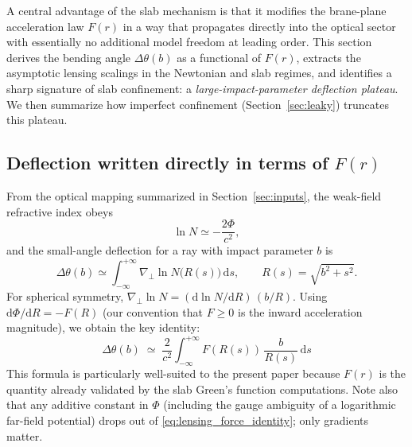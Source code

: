 \documentclass[11pt]{article}
\newcommand{\dd}{\mathrm{d}}
\begin{document}
A central advantage of the slab mechanism is that it modifies the brane-plane acceleration law
$F(r)$ in a way that propagates directly into the optical sector with essentially no additional model
freedom at leading order.
This section derives the bending angle $\Delta\theta(b)$ as a functional of $F(r)$, extracts the
asymptotic lensing scalings in the Newtonian and slab regimes, and identifies a sharp signature of
slab confinement: a \emph{large-impact-parameter deflection plateau}.
We then summarize how imperfect confinement (Section~\ref{sec:leaky}) truncates this plateau.

\subsection{Deflection written directly in terms of $F(r)$}
\label{sec:lensing_force_form}

From the optical mapping summarized in Section~\ref{sec:inputs}, the weak-field refractive index
obeys
\begin{equation}
  \ln N \simeq -\frac{2\Phi}{c^2},
\end{equation}
and the small-angle deflection for a ray with impact parameter $b$ is
\begin{equation}
  \Delta\theta(b)\simeq \int_{-\infty}^{+\infty}\nabla_\perp \ln N\bigl(R(s)\bigr)\,\dd s,
  \qquad R(s)=\sqrt{b^2+s^2}.
\end{equation}
For spherical symmetry, $\nabla_\perp \ln N = (\dd \ln N/\dd R)\,(b/R)$.
Using $\dd\Phi/\dd R=-F(R)$ (our convention that $F\ge 0$ is the inward acceleration magnitude),
we obtain the key identity:
\begin{equation}
  \boxed{
  \Delta\theta(b)
  \;\simeq\;
  \frac{2}{c^2}\int_{-\infty}^{+\infty}
  F\!\left(R(s)\right)\,\frac{b}{R(s)}\,\dd s
  }
  \label{eq:lensing_force_identity}
\end{equation}
This formula is particularly well-suited to the present paper because $F(r)$ is the quantity already
validated by the slab Green's function computations.  Note also that any additive constant in $\Phi$
(including the gauge ambiguity of a logarithmic far-field potential) drops out of
\eqref{eq:lensing_force_identity}; only gradients matter.
\end{document}
